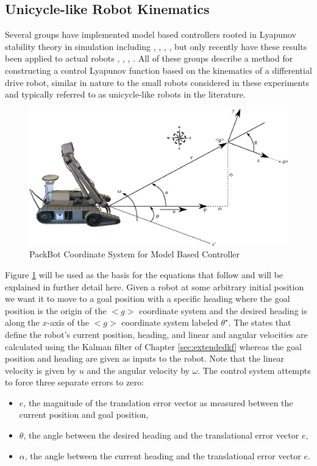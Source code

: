 \subsection{Unicycle-like Robot Kinematics}
\label{sec:unicycleKinematics}
Several groups have implemented model based controllers rooted in Lyapunov stability theory in simulation including \cite{MicaelliLyapunov93}, \cite{Aicardi94}, \cite{Aicardi_UnicycleLyapunov95}, \cite{Rusu05RobotuxLyapunov}, \cite{Gulati08} but only recently have these results been applied to actual robots \cite{KimLyapunov05}, \cite{Lapierre06}, \cite{Lapierre07}, \cite{NuchterLyapunov07}. All of these groups describe a method for constructing a control Lyapunov function based on the kinematics of a differential drive robot, similar in nature to the small robots considered in these experiments and typically referred to as unicycle-like robots in the literature.

\begin{figure}[ht!]
	\centering
	\includegraphics[width=.95\textwidth]{images/packbotlyapunov}
	\caption{PackBot Coordinate System for Model Based Controller}
	\label{fig:pblyapunov}
\end{figure}

Figure \ref{fig:pblyapunov} will be used as the basis for the equations that follow and will be explained in further detail here. Given a robot at some arbitrary initial position we want it to move to a goal position with a specific heading where the goal position is the origin of the $<g>$ coordinate system and the desired heading is along the $x$-axis of the $<g>$ coordinate system labeled $\theta^\star$. The states that define the robot's current position, heading, and linear and angular velocities are calculated using the Kalman filter of Chapter \ref{sec:extendedkf} whereas the goal position and heading are given as inputs to the robot. Note that the linear velocity is given by $u$ and the angular velocity by $\omega$. The control system attempts to force three separate errors to zero:
\begin{itemize}
\item $e$, the magnitude of the translation error vector as measured between the current position and goal position,
\item $\theta$, the angle between the desired heading and the translational error vector $e$,
\item $\alpha$, the angle between the current heading and the translational error vector $e$.
\end{itemize}

